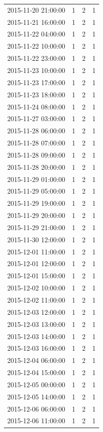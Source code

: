 \begin{tabular}{lrrr}
2015-11-20 21:00:00 & 1 & 2 & 1 \\
2015-11-21 16:00:00 & 1 & 2 & 1 \\
2015-11-22 04:00:00 & 1 & 2 & 1 \\
2015-11-22 10:00:00 & 1 & 2 & 1 \\
2015-11-22 23:00:00 & 1 & 2 & 1 \\
2015-11-23 10:00:00 & 1 & 2 & 1 \\
2015-11-23 17:00:00 & 1 & 2 & 1 \\
2015-11-23 18:00:00 & 1 & 2 & 1 \\
2015-11-24 08:00:00 & 1 & 2 & 1 \\
2015-11-27 03:00:00 & 1 & 2 & 1 \\
2015-11-28 06:00:00 & 1 & 2 & 1 \\
2015-11-28 07:00:00 & 1 & 2 & 1 \\
2015-11-28 09:00:00 & 1 & 2 & 1 \\
2015-11-28 20:00:00 & 1 & 2 & 1 \\
2015-11-29 01:00:00 & 1 & 2 & 1 \\
2015-11-29 05:00:00 & 1 & 2 & 1 \\
2015-11-29 19:00:00 & 1 & 2 & 1 \\
2015-11-29 20:00:00 & 1 & 2 & 1 \\
2015-11-29 21:00:00 & 1 & 2 & 1 \\
2015-11-30 12:00:00 & 1 & 2 & 1 \\
2015-12-01 11:00:00 & 1 & 2 & 1 \\
2015-12-01 12:00:00 & 1 & 2 & 1 \\
2015-12-01 15:00:00 & 1 & 2 & 1 \\
2015-12-02 10:00:00 & 1 & 2 & 1 \\
2015-12-02 11:00:00 & 1 & 2 & 1 \\
2015-12-03 12:00:00 & 1 & 2 & 1 \\
2015-12-03 13:00:00 & 1 & 2 & 1 \\
2015-12-03 14:00:00 & 1 & 2 & 1 \\
2015-12-03 16:00:00 & 1 & 2 & 1 \\
2015-12-04 06:00:00 & 1 & 2 & 1 \\
2015-12-04 15:00:00 & 1 & 2 & 1 \\
2015-12-05 00:00:00 & 1 & 2 & 1 \\
2015-12-05 14:00:00 & 1 & 2 & 1 \\
2015-12-06 06:00:00 & 1 & 2 & 1 \\
2015-12-06 11:00:00 & 1 & 2 & 1 \\

\end{tabular}
